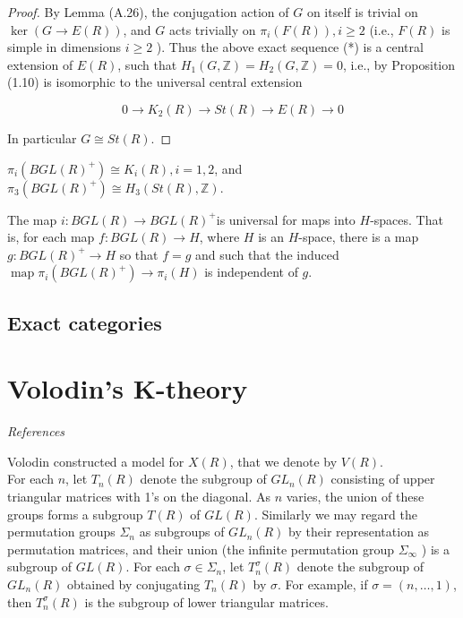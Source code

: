 \begin{proof}
    By Lemma (A.26), the conjugation action of $G$ on itself is trivial on $\operatorname{ker}(G \longrightarrow E(R))$, and $G$ acts trivially on $\pi_i(F(R)), i \geq 2$ (i.e., $F(R)$ is simple in dimensions $i \geq 2$ ). Thus the above exact sequence (*) is a central extension of $E(R)$, such that $H_1(G, \mathbb{Z})=H_2(G, \mathbb{Z})=0$, i.e., by Proposition (1.10) is isomorphic to the universal central extension
    
    $$
    0 \longrightarrow K_2(R) \longrightarrow S t(R) \longrightarrow E(R) \longrightarrow 0
    $$
    
    
    In particular $G \cong S t(R)$.


\end{proof}


\begin{coro}
$\pi_i\left(B G L(R)^{+}\right) \cong K_i(R), i=1,2$, and
$
\pi_3\left(B G L(R)^{+}\right) \cong H_3(S t(R), \mathbb{Z}) .
$
\end{coro}


\begin{theo} %
The map $i: B G L(R) \rightarrow B G L(R)^{+}$is universal for maps into $H$-spaces. That is, for each map $f: B G L(R) \rightarrow H$, where $H$ is an $H$-space, there is a map $g: B G L(R)^{+} \rightarrow H$ so that $f=g$ and such that the induced $\operatorname{map} \pi_i\left(B G L(R)^{+}\right) \rightarrow \pi_i(H)$ is independent of $g$.
\end{theo}

\section{Exact categories}



\chapter{Volodin's K-theory}

\textit{References} \cite{weibelKbookIntroductionAlgebraic2013a,suslinEquivalenceKtheories1981c,suslinStabilityAlgebraicKtheory1982}

Volodin constructed a model for $X(R)$, that we denote by $V(R)$. \\
For each $n$, let $T_n(R)$ denote the subgroup of $G L_n(R)$ consisting of upper triangular matrices with 1's on the diagonal. As $n$ varies, the union of these groups forms a subgroup $T(R)$ of $G L(R)$. Similarly we may regard the permutation groups $\Sigma_n$ as subgroups of $G L_n(R)$ by their representation as permutation matrices, and their union (the infinite permutation group $\Sigma_{\infty}$ ) is a subgroup of $G L(R)$. For each $\sigma \in \Sigma_n$, let $T_n^\sigma(R)$ denote the subgroup of $G L_n(R)$ obtained by conjugating $T_n(R)$ by $\sigma$. For example, if $\sigma=(n, \ldots, 1)$, then $T_n^\sigma(R)$ is the subgroup of lower triangular matrices.

